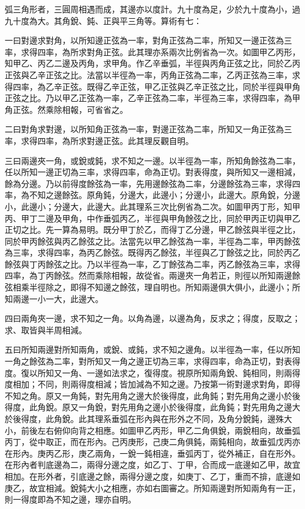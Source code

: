 \begin{pinyinscope}
弧三角形者，三圓周相遇而成，其邊亦以度計。九十度為足，少於九十度為小，過九十度為大。其角銳、鈍、正與平三角等。算術有七：

一曰對邊求對角，以所知邊正弦為一率，對角正弦為二率，所知又一邊正弦為三率，求得四率，為所求對角正弦。此其理亦系兩次比例省為一次。如圖甲乙丙形，知甲乙、丙乙二邊及丙角，求甲角。作乙辛垂弧，半徑與丙角正弦之比，同於乙丙正弦與乙辛正弦之比。法當以半徑為一率，丙角正弦為二率，乙丙正弦為三率，求得四率，為乙辛正弦。既得乙辛正弦，甲乙正弦與乙辛正弦之比，同於半徑與甲角正弦之比。乃以甲乙正弦為一率，乙辛正弦為二率，半徑為三率，求得四率，為甲角正弦。然乘除相報，可省省之。

二曰對角求對邊，以所知角正弦為一率，對邊正弦為二率，所知又一角正弦為三率，求得四率，為所求對邊正弦。此其理反觀自明。

三曰兩邊夾一角，或銳或鈍，求不知之一邊。以半徑為一率，所知角餘弦為二率，任以所知一邊正切為三率，求得四率，命為正切。對表得度，與所知又一邊相減，餘為分邊。乃以前得度餘弦為一率，先用邊餘弦為二率，分邊餘弦為三率，求得四率，為不知之邊餘弦。原角鈍，分邊大，此邊小；分邊小，此邊大。原角銳，分邊小，此邊小；分邊大，此邊大。此其理系三次比例省為二次。如圖甲丙丁形，知甲丙、甲丁二邊及甲角，中作垂弧丙乙，半徑與甲角餘弦之比，同於甲丙正切與甲乙正切之比。先一算為易明。既分甲丁於乙，而得丁乙分邊，甲乙餘弦與半徑之比，同於甲丙餘弦與丙乙餘弦之比。法當先以甲乙餘弦為一率，半徑為二率，甲丙餘弦為三率，求得四率，為丙乙餘弦。既得丙乙餘弦，半徑與乙丁餘弦之比，同於丙乙餘弦與丁丙餘弦之比。乃以半徑為一率，乙丁餘弦為二率，丙乙餘弦為三率，求得四率，為丁丙餘弦。然而乘除相報，故從省。兩邊夾一角若正，則徑以所知兩邊餘弦相乘半徑除之，即得不知邊之餘弦，理自明也。所知兩邊俱大俱小，此邊小；所知兩邊一小一大，此邊大。

四曰兩角夾一邊，求不知之一角。以角為邊，以邊為角，反求之；得度，反取之；求、取皆與半周相減。

五曰所知兩邊對所知兩角，或銳、或鈍，求不知之邊角。以半徑為一率，任以所知一角之餘弦為二率，對所知又一角之邊正切為三率，求得四率，命為正切，對表得度。復以所知又一角、一邊如法求之，復得度。視原所知兩角銳、鈍相同，則兩得度相加；不同，則兩得度相減；皆加減為不知之邊。乃按第一術對邊求對角，即得不知之角。原又一角鈍，對先用角之邊大於後得度，此角鈍；對先用角之邊小於後得度，此角銳。原又一角銳，對先用角之邊小於後得度，此角鈍；對先用角之邊大於後得度，此角銳。此其理系垂弧在形內與在形外之不同，及角分銳鈍，邊殊大小，前後左右俯仰向背之相應。如圖甲乙丙形，甲乙二角俱銳，兩銳相向，故垂弧丙丁，從中取正，而在形內。己丙庚形，己庚二角俱鈍，兩鈍相向，故垂弧戊丙亦在形內。庚丙乙形，庚乙兩角，一銳一鈍相違，垂弧丙丁，從外補正，自在形外。在形內者判底邊為二，兩得分邊之度，如乙丁、丁甲，合而成一底邊如乙甲，故宜相加。在形外者，引底邊之餘，兩得分邊之度，如庚丁、乙丁，重而不揜，底邊如庚乙，故宜相減。銳鈍大小之相應，亦如右圖審之。所知兩邊對所知兩角有一正，則一得度即為不知之邊，理亦自明。


\end{pinyinscope}
